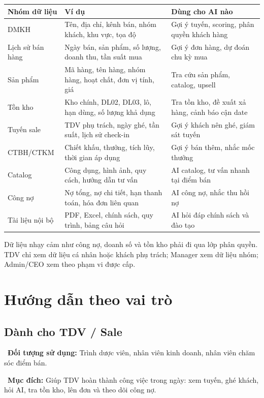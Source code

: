 \documentclass[12pt,a4paper,oneside,openany]{book}
\newcommand{\screenpurpose}[1]{\begin{tcolorbox}[colback=medgreen!8,colframe=medgreen!55,left=6pt,right=6pt,top=4pt,bottom=4pt]\faFlag\ \textbf{Mục đích:} #1\end{tcolorbox}}
\newcommand{\screenuser}[1]{\noindent\faUsers\ \textbf{Đối tượng sử dụng:} #1\par\smallskip}
\begin{document}
\begin{longtable}{p{3.2cm}p{5.2cm}p{5.2cm}}
\toprule
\textbf{Nhóm dữ liệu} & \textbf{Ví dụ} & \textbf{Dùng cho AI nào} \\
\midrule
DMKH & Tên, địa chỉ, kênh bán, nhóm khách, khu vực, tọa độ & Gợi ý tuyến, scoring, phân quyền khách hàng \\
Lịch sử bán hàng & Ngày bán, sản phẩm, số lượng, doanh thu, tần suất mua & Gợi ý đơn hàng, dự đoán chu kỳ mua \\
Sản phẩm & Mã hàng, tên hàng, nhóm hàng, hoạt chất, đơn vị tính, giá & Tra cứu sản phẩm, catalog, upsell \\
Tồn kho & Kho chính, DL02, DL03, lô, hạn dùng, số lượng khả dụng & Tra tồn kho, đề xuất xả hàng, cảnh báo cận date \\
Tuyến sale & TDV phụ trách, ngày ghé, tần suất, lịch sử check-in & Gợi ý khách nên ghé, giám sát tuyến \\
CTBH/CTKM & Chiết khấu, thưởng, tích lũy, thời gian áp dụng & Gợi ý bán thêm, nhắc mốc thưởng \\
Catalog & Công dụng, hình ảnh, quy cách, hướng dẫn tư vấn & AI catalog, tư vấn nhanh tại điểm bán \\
Công nợ & Nợ tổng, nợ chi tiết, hạn thanh toán, hóa đơn liên quan & AI công nợ, nhắc thu hồi nợ \\
Tài liệu nội bộ & PDF, Excel, chính sách, quy trình, bảng câu hỏi & AI hỏi đáp chính sách và đào tạo \\
\bottomrule
\end{longtable}

\begin{tcolorbox}[warnBox]
Dữ liệu nhạy cảm như công nợ, doanh số và tồn kho phải đi qua lớp phân quyền. TDV chỉ xem dữ liệu cá nhân hoặc khách phụ trách; Manager xem dữ liệu nhóm; Admin/CEO xem theo phạm vi được cấp.
\end{tcolorbox}

\part{Hướng dẫn theo vai trò}

\chapter{Dành cho TDV / Sale}
\screenuser{Trình dược viên, nhân viên kinh doanh, nhân viên chăm sóc điểm bán.}
\screenpurpose{Giúp TDV hoàn thành công việc trong ngày: xem tuyến, ghé khách, hỏi AI, tra tồn kho, lên đơn và theo dõi công nợ.}
\end{document}
